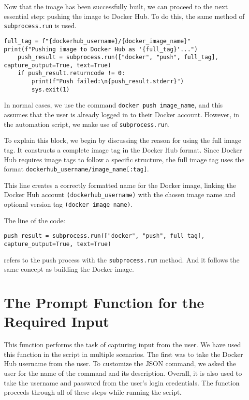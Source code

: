 Now that the image has been successfully built, we can proceed to the next essential step: pushing the image to Docker Hub. To do this, the same method of \texttt{subprocess.run} is used.


\begin{lstlisting}
full_tag = f"{dockerhub_username}/{docker_image_name}"
print(f"Pushing image to Docker Hub as '{full_tag}'...")
    push_result = subprocess.run(["docker", "push", full_tag], capture_output=True, text=True)
    if push_result.returncode != 0:
        print(f"Push failed:\n{push_result.stderr}")
        sys.exit(1)

\end{lstlisting}

In normal cases, we use the command \texttt{docker push image\_name}, and this assumes that the user is already logged in to their Docker account. However, in the automation script, we make use of \texttt{subprocess.run}.

To explain this block, we begin by discussing the reason for using the full image tag. It constructs a complete image tag in the Docker Hub format. Since Docker Hub requires image tags to follow a specific structure, the full image tag uses the format \texttt{dockerhub\_username/image\_name[:tag]}.

This line creates a correctly formatted name for the Docker image, linking the Docker Hub account \texttt{(dockerhub\_username)} with the chosen image name and optional version tag \texttt{(docker\_image\_name)}.

The line of the code: 
\begin{lstlisting}
push_result = subprocess.run(["docker", "push", full_tag], capture_output=True, text=True)
\end{lstlisting}
refers to the push process with the \texttt{subprocess.run} method. And it follows the same concept as building the Docker image. 

\section{The Prompt Function for the Required Input}

This function performs the task of capturing input from the user.
We have used this function in the script in multiple scenarios. The first was to take the Docker Hub username from the user. To customize the JSON command, we asked the user for the name of the command and its description. Overall, it is also used to take the username and password from the user’s login credentials. The function proceeds through all of these steps while running the script.

